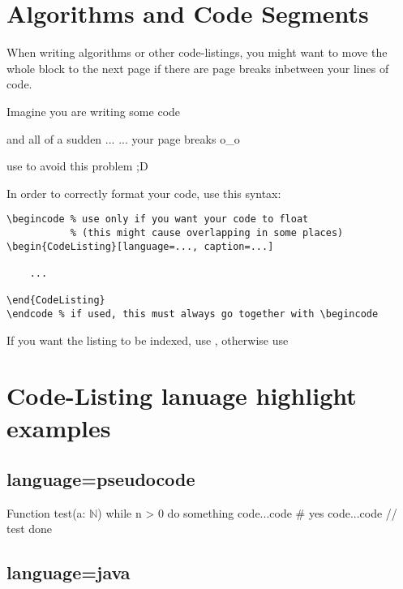 \documentclass[
    narrow,
    fontstyle=light,
    babelparam=ngerman
]{elite}
\begin{document}
\section{Algorithms and Code Segments}

When writing algorithms or other code-listings, you might want to move the whole block to the
next page if there are page breaks inbetween your lines of code.

\vspace{1em}

\begin{CodeListing}[caption=Code-Listing Positioning]
Imagine you are writing some code

and all of a sudden
...
...
your page breaks o_o

use \filbreak to avoid this problem ;D
\end{CodeListing}

In order to correctly format your code, use this syntax:
\begin{verbatim}
\begincode % use only if you want your code to float
           % (this might cause overlapping in some places)
\begin{CodeListing}[language=..., caption=...]

    ...

\end{CodeListing}
\endcode % if used, this must always go together with \begincode
\end{verbatim}

If you want the listing to be indexed, use , otherwise use 

\section*{Code-Listing lanuage highlight examples}

\subsection{language=pseudocode}

\begin{CodeListing}[language=pseudocode]
Function test(a: $\mathbb{N}$) {
    while n > 0 do
        something
        code...code    # yes
        code...code    // test
    done
}
\end{CodeListing}

\subsection{language=java}
\end{document}

